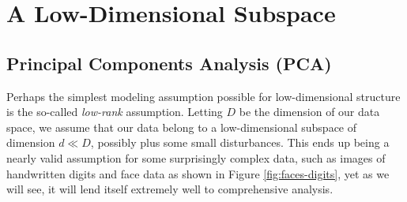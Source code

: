 \documentclass[../../book-main.tex]{subfiles}
\begin{document}







\section{A Low-Dimensional Subspace} \label{sec:lowrank}

\subsection{Principal Components Analysis (PCA)}\label{sub:pca}

Perhaps the simplest modeling assumption possible for low-dimensional structure
is the so-called \textit{low-rank} assumption. Letting \(D\) be the dimension of
our data space, we assume that our data belong to a low-dimensional subspace of dimension \(d \ll D\), possibly plus some small disturbances. This ends up being a nearly valid assumption for some surprisingly complex data, such as images of handwritten digits and face data \cite{BasriR2003-PAMI} as shown in Figure \ref{fig:faces-digits}, yet as we will see, it will lend itself extremely well to comprehensive analysis. 
\end{document}
